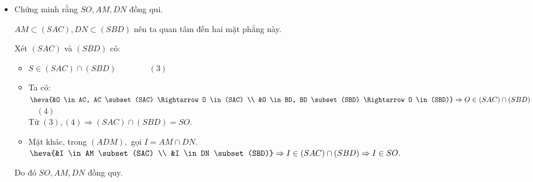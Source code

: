 \begin{bt}
{\begin{itemize}
{}
			\item Chứng minh rằng $SO, AM, DN$ đồng qui.
			\begin{note}
				$AM \subset (SAC), DN \subset (SBD)$ nên ta quan tâm đến hai mặt phẳng này.
			\end{note}
			Xét $(SAC)$ và $(SBD)$ có:
			\begin{itemize}
				\item $S \in(SAC) \cap (SBD) \quad\quad\quad\quad (3)$
				\item Ta có: $\heva{&O \in AC, AC \subset (SAC) \Rightarrow O \in(SAC) \\ 
					&O \in BD, BD \subset(SBD) \Rightarrow O \in(SBD)} \Rightarrow O \in (SAC) \cap (SBD)$ $\quad (4)$\\
				Từ $(3),(4) \Rightarrow(SAC) \cap(SBD)=SO.$
				\item Mặt khác, trong $(ADM),$ gọi $I= AM \cap DN$.\\
				$\heva{&I \in AM \subset(SAC) \\ &I \in DN \subset(SBD)} \Rightarrow I \in(SAC) \cap(SBD) \Rightarrow I \in SO.$
			\end{itemize}
			Do đó $SO, AM, DN$ đồng quy.
		\end{itemize}
	}
\end{bt}


